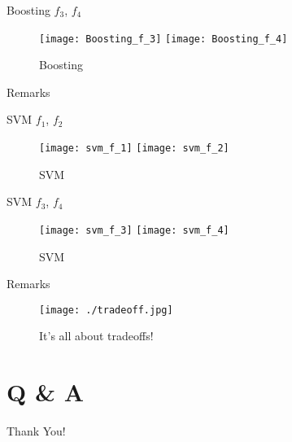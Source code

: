 \documentclass[
  ignorenonframetext,
]{beamer}
\begin{document}
\begin{frame}{Boosting \(f_3\), \(f_4\)}
\protect\hypertarget{boosting-f_3-f_4}{}
\begin{figure}

{\centering \texttt{[image: Boosting\_f\_3]} \texttt{[image: Boosting\_f\_4]} 

}

\caption{Boosting}\label{fig:boosting-2}
\end{figure}
\end{frame}

\begin{frame}{Remarks}
\protect\hypertarget{remarks-2}{}
\end{frame}

\begin{frame}{SVM \(f_1\), \(f_2\)}
\protect\hypertarget{svm-f_1-f_2}{}
\begin{figure}

{\centering \texttt{[image: svm\_f\_1]} \texttt{[image: svm\_f\_2]} 

}

\caption{SVM}\label{fig:svm-1}
\end{figure}
\end{frame}

\begin{frame}{SVM \(f_3\), \(f_4\)}
\protect\hypertarget{svm-f_3-f_4}{}
\begin{figure}

{\centering \texttt{[image: svm\_f\_3]} \texttt{[image: svm\_f\_4]} 

}

\caption{SVM}\label{fig:svm-2}
\end{figure}
\end{frame}

\begin{frame}{Remarks}
\protect\hypertarget{remarks-3}{}
\end{frame}

\begin{frame}
\begin{figure}
\hypertarget{id}{%
\centering
\texttt{[image: ./tradeoff.jpg]}
\caption{It's all about tradeoffs!}\label{id}
}
\end{figure}
\end{frame}

\hypertarget{q-a}{%
\section{Q \& A}\label{q-a}}

\begin{frame}{Thank You!}
\protect\hypertarget{thank-you}{}
\end{frame}
\end{document}
